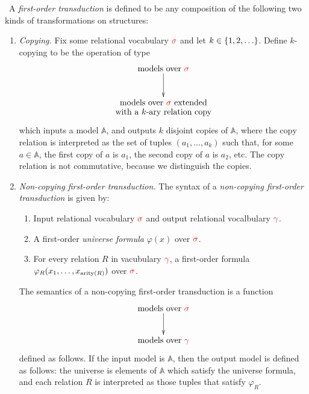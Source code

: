 \begin{definition}\label{def:fo-transduction-gen}\ 
    A \emph{first-order transduction} is defined to be any  composition of the following two kinds of transformations on structures:
\begin{enumerate}
    \item \emph{Copying.} Fix some  relational vocabulary ${\color{red}{\sigma}}$ and let $k \in \{1,2,\ldots\}$. Define $k$-copying to be the operation of type 
    \begin{align*}
    \xymatrix{
     \text{models over $\ranked \sigma$} \ar[d]\\
     \txt{models over $\ranked \sigma$  extended\\
with a $k$-ary relation $\mathrm{copy}$}
    }
    \end{align*}
which inputs a model $\mathbb A$, and outputs $k$ disjoint copies of $\mathbb A$, where the  $\mathrm{copy}$ relation is interpreted as the set of tuples $(a_1,\ldots,a_k)$ such that, for  some $a \in \mathbb A$, the first copy of $a$ is  $a_1$, the second copy of $a$ is $a_2$, etc. The $\mathrm{copy}$ relation  is not commutative, because we distinguish the copies.
\item    \emph{Non-copying first-order transduction.} The syntax of a \emph{non-copying first-order transduction}  is given by:
\begin{enumerate}
    \item Input relational vocabulary ${\color{red}{\sigma}}$ and output relational vocalbulary ${\color{red}{\gamma}}$.
    \item A first-order \emph{universe formula} $\varphi(x)$ over ${\color{red}{\sigma}}$.
    \item For every relation $R$ in vacubulary ${\color{red}{\gamma}}$, a first-order  formula $\varphi_R(x_1,\ldots,x_{\mathrm{arity}(R)})$ over ${\color{red}{\sigma}}$.
\end{enumerate}
The semantics of a non-copying first-order transduction is  a function
\begin{align*}
    \xymatrix{
        \text{models over $\ranked \sigma$} \ar[d]\\
        \text{models over $\ranked \gamma$}
    }
\end{align*}
defined as follows. If the input model is $\mathbb A$, then the output model is defined as follows: the universe is elements of $\mathbb A$ which satisfy the universe formula, and each relation $R$ is interpreted as those tuples that satisfy $\varphi_R$. 
 \end{enumerate}
\end{definition}

